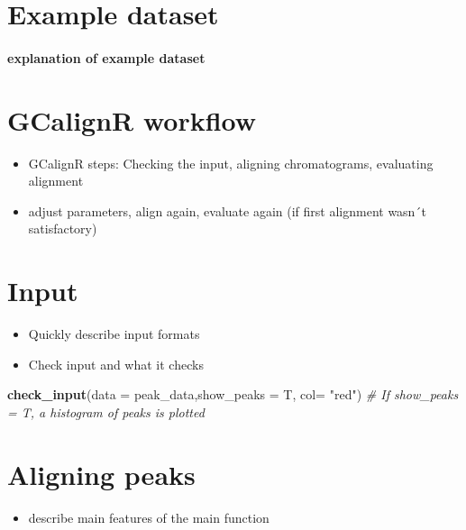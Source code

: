 \documentclass[]{article}
\newenvironment{Shaded}{}{}
\newcommand{\KeywordTok}[1]{\textbf{{#1}}}
\newcommand{\DataTypeTok}[1]{\textcolor[rgb]{0.50,0.00,0.00}{{#1}}}
\newcommand{\StringTok}[1]{\textcolor[rgb]{0.87,0.00,0.00}{{#1}}}
\newcommand{\CommentTok}[1]{\textcolor[rgb]{0.50,0.50,0.50}{\textit{{#1}}}}
\newcommand{\NormalTok}[1]{{#1}}
\providecommand{\tightlist}{%
  \setlength{\itemsep}{0pt}\setlength{\parskip}{0pt}}
\let\oldparagraph\paragraph
\renewcommand{\paragraph}[1]{\oldparagraph{#1}\mbox{}}
\begin{document}
\section{Example dataset}\label{example-dataset}

\paragraph{explanation of example
dataset}\label{explanation-of-example-dataset}

\section{GCalignR workflow}\label{gcalignr-workflow}

\begin{itemize}
\tightlist
\item
  GCalignR steps: Checking the input, aligning chromatograms, evaluating
  alignment
\item
  adjust parameters, align again, evaluate again (if first alignment
  wasn´t satisfactory)
\end{itemize}

\section{Input}\label{input}

\begin{itemize}
\tightlist
\item
  Quickly describe input formats
\item
  Check input and what it checks
\end{itemize}

\begin{Shaded}
\begin{Highlighting}[]
\KeywordTok{check_input}\NormalTok{(}\DataTypeTok{data =} \NormalTok{peak_data,}\DataTypeTok{show_peaks =} \NormalTok{T, }\DataTypeTok{col=} \StringTok{"red"}\NormalTok{) }\CommentTok{# If show_peaks = T, a histogram of peaks is plotted }
\end{Highlighting}
\end{Shaded}

\section{Aligning peaks}\label{aligning-peaks}

\begin{itemize}
\tightlist
\item
  describe main features of the main function
\end{itemize}
\end{document}
